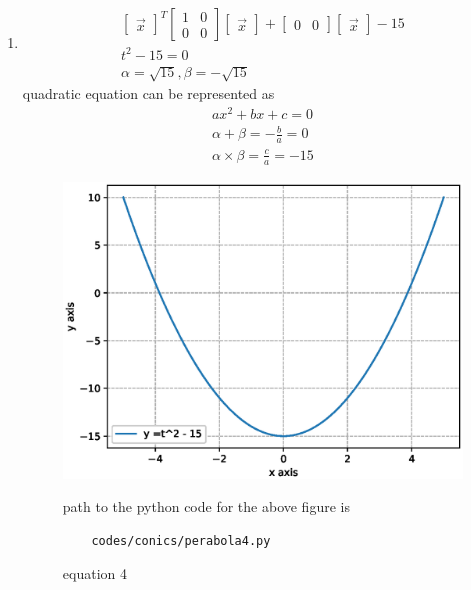\begin{enumerate}[label=\arabic*.,ref=\thesubsection.\theenumi]
\item
\begin{align}
\begin{bmatrix}\vec x\end{bmatrix}^T\begin{bmatrix}1 & 0\\0 & 0\end{bmatrix}\begin{bmatrix}\vec x\end{bmatrix} + \begin{bmatrix}0 & 0\end{bmatrix}\begin{bmatrix}\vec x\end{bmatrix} -15
\\
t^2 - 15 = 0
\\
\alpha = \sqrt {15} ,\beta =-\sqrt {15} 
\end{align}
quadratic equation can be represented as 
\begin{align}
ax^2+bx +c = 0
\\
\alpha +\beta = -\frac{b}{a} = 0
\\
\alpha \times \beta = \frac{c}{a} = -15
\end{align}
\begin{figure}[!ht]
	\centering
	\includegraphics[width=\columnwidth]{./figures/conics/perabola4.eps}
	\caption{equation 4 }
	\label{fig:perabola4}
	path to the python code for the above figure is 
	\begin{lstlisting}
	codes/conics/perabola4.py
	\end{lstlisting}
\end{figure}



\end{enumerate}
